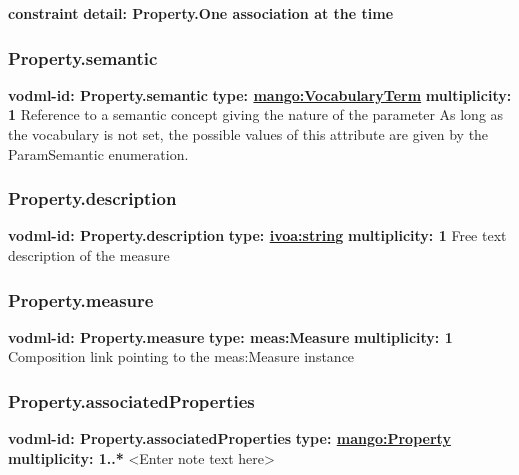     \noindent \textbf{constraint} \newline
    \indent    \textbf{detail: Property.One association at the time
 }\newline


    \subsubsection{Property.semantic}
      \textbf{vodml-id: Property.semantic} \newline
      \textbf{type: \hyperref[sect:VocabularyTerm]{mango:VocabularyTerm}} \newline
      \textbf{multiplicity: 1} \newline 
      Reference to a semantic concept giving the nature of the parameter As long as the vocabulary is not set, the possible values of this attribute are given by the ParamSemantic enumeration.

    \subsubsection{Property.description}
      \textbf{vodml-id: Property.description} \newline
      \textbf{type: \hyperref[sect:ivoa]{ivoa:string}} \newline
      \textbf{multiplicity: 1} \newline 
      Free text description of the measure

    \subsubsection{Property.measure}
      \textbf{vodml-id: Property.measure} \newline
      \textbf{type: meas:Measure} \newline
      \textbf{multiplicity: 1} \newline 
      Composition link pointing to the meas:Measure instance

    \subsubsection{Property.associatedProperties}
      \textbf{vodml-id: Property.associatedProperties} \newline
      \textbf{type: \hyperref[sect:Property]{mango:Property}} \newline
      \textbf{multiplicity: 1..*} \newline 
      <Enter note text here>

